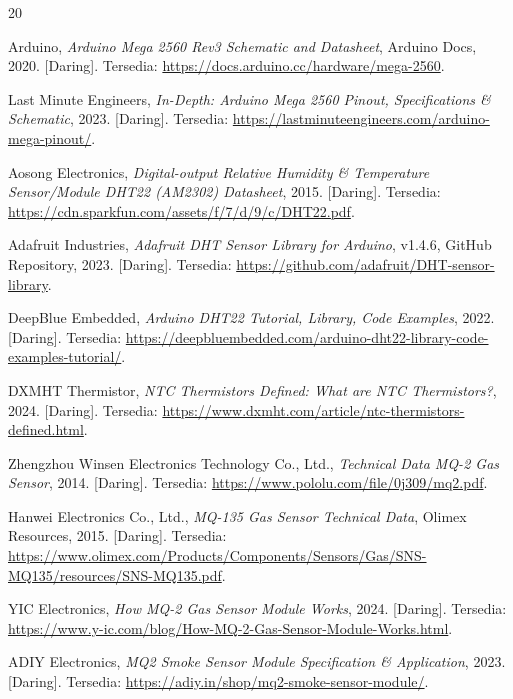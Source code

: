 \begin{thebibliography}{20}

Arduino,
\textit{Arduino Mega 2560 Rev3 Schematic and Datasheet},
Arduino Docs, 2020. [Daring]. Tersedia: \url{https://docs.arduino.cc/hardware/mega-2560}.

Last Minute Engineers,
\textit{In-Depth: Arduino Mega 2560 Pinout, Specifications \& Schematic},
2023. [Daring]. Tersedia: \url{https://lastminuteengineers.com/arduino-mega-pinout/}.

Aosong Electronics,
\textit{Digital-output Relative Humidity \& Temperature Sensor/Module DHT22 (AM2302) Datasheet},
2015. [Daring]. Tersedia: \url{https://cdn.sparkfun.com/assets/f/7/d/9/c/DHT22.pdf}.

Adafruit Industries,
\textit{Adafruit DHT Sensor Library for Arduino},
v1.4.6, GitHub Repository, 2023. [Daring]. Tersedia: \url{https://github.com/adafruit/DHT-sensor-library}.

DeepBlue Embedded,
\textit{Arduino DHT22 Tutorial, Library, Code Examples},
2022. [Daring]. Tersedia: \url{https://deepbluembedded.com/arduino-dht22-library-code-examples-tutorial/}.

DXMHT Thermistor,
\textit{NTC Thermistors Defined: What are NTC Thermistors?},
2024. [Daring]. Tersedia: \url{https://www.dxmht.com/article/ntc-thermistors-defined.html}.

Zhengzhou Winsen Electronics Technology Co., Ltd.,
\textit{Technical Data MQ-2 Gas Sensor},
2014. [Daring]. Tersedia: \url{https://www.pololu.com/file/0j309/mq2.pdf}.

Hanwei Electronics Co., Ltd.,
\textit{MQ-135 Gas Sensor Technical Data},
Olimex Resources, 2015. [Daring]. Tersedia: \url{https://www.olimex.com/Products/Components/Sensors/Gas/SNS-MQ135/resources/SNS-MQ135.pdf}.

YIC Electronics,
\textit{How MQ-2 Gas Sensor Module Works},
2024. [Daring]. Tersedia: \url{https://www.y-ic.com/blog/How-MQ-2-Gas-Sensor-Module-Works.html}.

ADIY Electronics,
\textit{MQ2 Smoke Sensor Module Specification \& Application},
2023. [Daring]. Tersedia: \url{https://adiy.in/shop/mq2-smoke-sensor-module/}.


\end{thebibliography}
